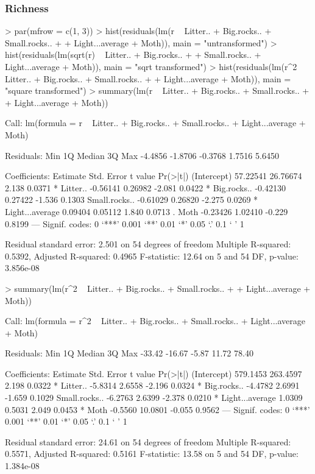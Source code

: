 \documentclass[a4paper]{article}
\begin{document}
\subsubsection{Richness}
\begin{Schunk}
\begin{Sinput}
> par(mfrow = c(1, 3))
> hist(residuals(lm(r ~ Litter.. + Big.rocks.. + Small.rocks.. + 
+     Light...average + Moth)), main = "untransformed")
> hist(residuals(lm(sqrt(r) ~ Litter.. + Big.rocks.. + 
+     Small.rocks.. + Light...average + Moth)), main = "sqrt transformed")
> hist(residuals(lm(r^2 ~ Litter.. + Big.rocks.. + Small.rocks.. + 
+     Light...average + Moth)), main = "square transformed")
> summary(lm(r ~ Litter.. + Big.rocks.. + Small.rocks.. + 
+     Light...average + Moth))
\end{Sinput}
\begin{Soutput}
Call:
lm(formula = r ~ Litter.. + Big.rocks.. + Small.rocks.. + Light...average + 
    Moth)

Residuals:
    Min      1Q  Median      3Q     Max 
-4.4856 -1.8706 -0.3768  1.7516  5.6450 

Coefficients:
                Estimate Std. Error t value Pr(>|t|)  
(Intercept)     57.22541   26.76674   2.138   0.0371 *
Litter..        -0.56141    0.26982  -2.081   0.0422 *
Big.rocks..     -0.42130    0.27422  -1.536   0.1303  
Small.rocks..   -0.61029    0.26820  -2.275   0.0269 *
Light...average  0.09404    0.05112   1.840   0.0713 .
Moth            -0.23426    1.02410  -0.229   0.8199  
---
Signif. codes:  0 ‘***’ 0.001 ‘**’ 0.01 ‘*’ 0.05 ‘.’ 0.1 ‘ ’ 1 

Residual standard error: 2.501 on 54 degrees of freedom
Multiple R-squared: 0.5392,	Adjusted R-squared: 0.4965 
F-statistic: 12.64 on 5 and 54 DF,  p-value: 3.856e-08 
\end{Soutput}
\begin{Sinput}
> summary(lm(r^2 ~ Litter.. + Big.rocks.. + Small.rocks.. + 
+     Light...average + Moth))
\end{Sinput}
\begin{Soutput}
Call:
lm(formula = r^2 ~ Litter.. + Big.rocks.. + Small.rocks.. + Light...average + 
    Moth)

Residuals:
   Min     1Q Median     3Q    Max 
-33.42 -16.67  -5.87  11.72  78.40 

Coefficients:
                Estimate Std. Error t value Pr(>|t|)  
(Intercept)     579.1453   263.4597   2.198   0.0322 *
Litter..         -5.8314     2.6558  -2.196   0.0324 *
Big.rocks..      -4.4782     2.6991  -1.659   0.1029  
Small.rocks..    -6.2763     2.6399  -2.378   0.0210 *
Light...average   1.0309     0.5031   2.049   0.0453 *
Moth             -0.5560    10.0801  -0.055   0.9562  
---
Signif. codes:  0 ‘***’ 0.001 ‘**’ 0.01 ‘*’ 0.05 ‘.’ 0.1 ‘ ’ 1 

Residual standard error: 24.61 on 54 degrees of freedom
Multiple R-squared: 0.5571,	Adjusted R-squared: 0.5161 
F-statistic: 13.58 on 5 and 54 DF,  p-value: 1.384e-08 
\end{Soutput}
\end{Schunk}
\end{document}
